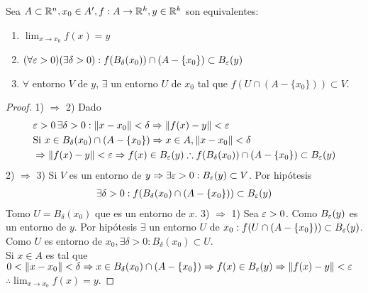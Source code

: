 \begin{prop}
  Sea \(A \subset \mathbb{R}^n, x_0 \in A^{\prime}, f: A \to \mathbb{R}^k, y \in \mathbb{R}^k\) son equivalentes:
  \begin{enumerate}
    \item \(\lim_{x \to x_0} f(x) = y\)
    \item \((\forall \varepsilon > 0)(\exists \delta > 0) : f(B_{\delta}(x_0)) \cap (A - \{x_0\}) \subset B_{\varepsilon}(y)\)
    \item \(\forall \) entorno \(V\) de \(y\), \(\exists \) un entorno \(U\) de \(x_0\) tal que \(f(U \cap (A - \{x_0\})) \subset V\).
  \end{enumerate}

  \begin{proof}
    1) \(\Rightarrow \) 2) Dado \begin{align*}
       & \varepsilon > 0 \, \exists \delta > 0 : \|x - x_0 \| < \delta \Rightarrow \|f(x) - y\| < \varepsilon                                              \\
       & \text{Si } x \in B_{\delta}(x_0) \cap (A - \{x_0\}) \Rightarrow x \in A, \|x - x_0\| < \delta                                   \\
       & \Rightarrow \|f(x) - y\| < \varepsilon \Rightarrow f(x) \in B_{\varepsilon}(y) \therefore f(B_{\delta}(x_0)) \cap (A - \{x_0\}) \subset B_{\varepsilon}(y)
    \end{align*}
    2) \(\Rightarrow \) 3) Si \(V\) es un entorno de \(y \Rightarrow \exists \varepsilon > 0 : B_{\varepsilon}(y) \subset V\). Por hipótesis \begin{align*}
      \exists \delta > 0 : f(B_{\delta}(x_0) \cap (A - \{x_0\})) \subset B_{\varepsilon}(y)
    \end{align*} Tomo \(U = B_{\delta}(x_0)\) que es un entorno de \(x\).
    3) \(\Rightarrow \) 1) Sea \(\varepsilon > 0\). Como \(B_{\varepsilon}(y)\) es un entorno de \(y\). Por hipótesis \(\exists \) un entorno \(U\) de \(x_0 : f(U \cap (A - \{x_0\})) \subset B_{\varepsilon}(y)\). Como \(U\) es entorno de \(x_0, \exists \delta > 0 : B_{\delta}(x_0) \subset U\). \\
    Si \(x \in A\) es tal que \(0 < \|x - x_0\| < \delta \Rightarrow x \in B_{\delta}(x_0) \cap (A - \{x_0\}) \Rightarrow f(x) \in B_{\varepsilon}(y) \Rightarrow \|f(x) - y\| < \varepsilon \) \\
    \(\therefore \lim_{x \to x_0} f(x) = y\).
  \end{proof}
\end{prop}

